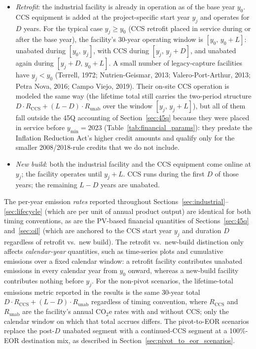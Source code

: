 \documentclass[11pt]{article}
\newcommand{\cotwoe}{\ensuremath{\mathrm{CO_{2}e}}}
\begin{document}
\begin{itemize}
  \item \emph{Retrofit}: the industrial facility is already in operation as of the base year $y_0$. CCS equipment is added at the project-specific start year $y_j$ and operates for $D$ years. For the typical case $y_j \geq y_0$ (CCS retrofit placed in service during or after the base year), the facility's 30-year operating window is $[y_0,\,y_0 + L]$: unabated during $[y_0,\,y_j]$, with CCS during $[y_j,\,y_j + D]$, and unabated again during $[y_j + D,\,y_0 + L]$. A small number of legacy-capture facilities have $y_j < y_0$ (Terrell, 1972; Nutrien-Geismar, 2013; Valero-Port-Arthur, 2013; Petra Nova, 2016; Campo Viejo, 2019). Their on-site CCS operation is modeled the same way (the lifetime total still carries the two-period structure $D \cdot R_{\text{CCS}} + (L - D) \cdot R_{\text{unab}}$ over the window $[y_j,\,y_j + L]$), but all of them fall outside the 45Q accounting of Section~\ref{sec:45q} because they were placed in service before $y_{\min} = 2023$ (Table~\ref{tab:financial_params}): they predate the Inflation Reduction Act's higher credit amounts and qualify only for the smaller 2008/2018-rule credits that we do not include.
  \item \emph{New build}: both the industrial facility and the CCS equipment come online at $y_j$; the facility operates until $y_j + L$. CCS runs during the first $D$ of those years; the remaining $L - D$ years are unabated.
\end{itemize}

The per-year emission \emph{rates} reported throughout Sections~\ref{sec:industrial}--\ref{sec:lifecycle} (which are per unit of annual product output) are identical for both timing conventions, as are the PV-based financial quantities of Sections~\ref{sec:45q} and~\ref{sec:oil} (which are anchored to the CCS start year $y_j$ and duration $D$ regardless of retrofit vs.\ new build). The retrofit vs.\ new-build distinction only affects \emph{calendar-year} quantities, such as time-series plots and cumulative emissions over a fixed calendar window: a retrofit facility contributes unabated emissions in every calendar year from $y_0$ onward, whereas a new-build facility contributes nothing before $y_j$. For the non-pivot scenarios, the lifetime-total emissions metric reported in the results is the same 30-year total $D \cdot R_{\text{CCS}} + (L - D) \cdot R_{\text{unab}}$ regardless of timing convention, where $R_{\text{CCS}}$ and $R_{\text{unab}}$ are the facility's annual \cotwoe{} rates with and without CCS; only the calendar window on which that total accrues differs. The pivot-to-EOR scenarios replace the post-$D$ unabated segment with a continued-CCS segment at a 100\%-EOR destination mix, as described in Section~\ref{sec:pivot_to_eor_scenarios}.
\end{document}
